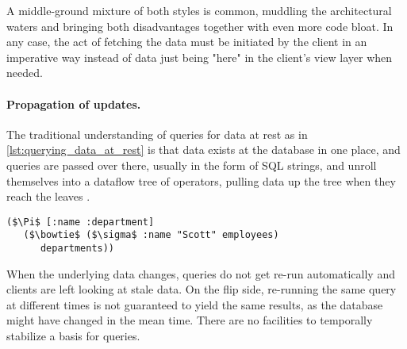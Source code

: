 A middle-ground mixture of both styles is common, muddling the architectural waters and bringing both disadvantages together with even more code bloat. In any case, the act of fetching the data must be initiated by the client in an imperative way instead of data just being "here" in the client's view layer when needed.


\paragraph{Propagation of updates.}
The traditional understanding of queries for data at rest as in \autoref{lst:querying_data_at_rest} is that data exists at the database in one place, and queries are passed over there, usually in the form of SQL strings, and unroll themselves into a dataflow tree of operators, pulling data up the tree when they reach the leaves \cite{alvaro2015isee}.

\begin{lstlisting}[label={lst:querying_data_at_rest},morekeywords={employees,departments},caption=Querying data at rest \cite{alvaro2015isee}]
($\Pi$ [:name :department]
   ($\bowtie$ ($\sigma$ :name "Scott" employees)
      departments))
\end{lstlisting}

When the underlying data changes, queries do not get re-run automatically and clients are left looking at stale data. On the flip side, re-running the same query at different times is not guaranteed to yield the same results, as the database might have changed in the mean time. There are no facilities to temporally stabilize a basis for queries.
